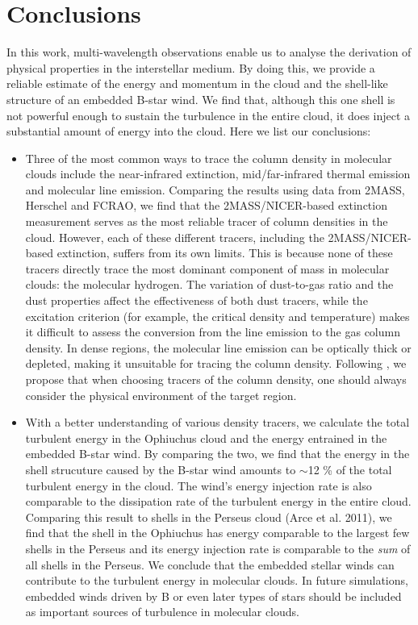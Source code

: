 \documentclass[11pt,a4paper]{emulateapj}
\begin{document}
\section{Conclusions}
In this work, multi-wavelength observations enable us to analyse the derivation of physical properties in the interstellar medium. By doing this, we provide a reliable estimate of the energy and momentum in the cloud and the shell-like structure of an embedded B-star wind. We find that, although this one shell is not powerful enough to sustain the turbulence in the entire cloud, it does inject a substantial amount of energy into the cloud. Here we list our conclusions:

\begin{itemize}
\item Three of the most common ways to trace the column density in molecular clouds include the near-infrared extinction, mid/far-infrared thermal emission and molecular line emission. Comparing the results using data from 2MASS, Herschel and FCRAO, we find that the 2MASS/NICER-based extinction measurement serves as the most reliable tracer of column densities in the cloud. However, each of these different tracers, including the 2MASS/NICER-based extinction, suffers from its own limits. This is because none of these tracers directly trace the most dominant component of mass in molecular clouds: the molecular hydrogen. The variation of dust-to-gas ratio and the dust properties affect the effectiveness of both dust tracers, while the excitation criterion (for example, the critical density and temperature) makes it difficult to assess the conversion from the line emission to the gas column density. In dense regions, the molecular line emission can be optically thick or depleted, making it unsuitable for tracing the column density. Following \citet{Goodman_2009}, we propose that when choosing tracers of the column density, one should always consider the physical environment of the target region. 
\item With a better understanding of various density tracers, we calculate the total turbulent energy in the Ophiuchus cloud and the energy entrained in the embedded B-star wind. By comparing the two, we find that the energy in the shell strucuture caused by the B-star wind amounts to $\sim$12 \% of the total turbulent energy in the cloud. The wind's energy injection rate is also comparable to the dissipation rate of the turbulent energy in the entire cloud. Comparing this result to shells in the Perseus cloud (Arce et al. 2011), we find that the shell in the Ophiuchus has energy comparable to the largest few shells in the Perseus and its energy injection rate is comparable to the \emph{sum} of all shells in the Perseus. We conclude that the embedded stellar winds can contribute to the turbulent energy in molecular clouds. In future simulations, embedded winds driven by B or even later types of stars should be included as important sources of turbulence in molecular clouds.
\end{itemize}



\end{document}
